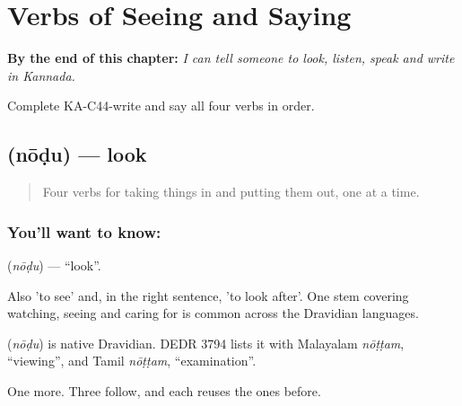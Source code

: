 
\chapter{Verbs of Seeing and Saying}
\label{ch:ka-see-say}

\begin{chapteropening}
\textbf{By the end of this chapter:} \emph{I can tell someone to look, listen, speak and write in Kannada.}

Complete KA-C44-write and say all four verbs in order.
\end{chapteropening}

\section[\texorpdfstring{\kn{ನೋಡು} (nōḍu)}{ನೋಡು (nōḍu)}]{ (nōḍu) — look}

\label{lesson:KA-C44-look}



\begin{quote}
Four verbs for taking things in and putting them out, one at a time.
\end{quote}

\subsection*{You'll want to know: }
\textbf{} (\emph{nōḍu}) — \textquotedblleft{}look\textquotedblright{}.

Also 'to see' and, in the right sentence, 'to look after'. One stem covering watching, seeing and caring for is common across the Dravidian languages.

\begin{cousinweb}
\textbf{} (\emph{nōḍu}) is native Dravidian. DEDR 3794 lists it with Malayalam \emph{nōṭṭam}, \textquotedblleft{}viewing\textquotedblright{}, and Tamil \emph{nōṭṭam}, \textquotedblleft{}examination\textquotedblright{}.
\end{cousinweb}

\begin{grammarlens}[title={What you've built}]
One more. Three follow, and each reuses the ones before.
\end{grammarlens}


